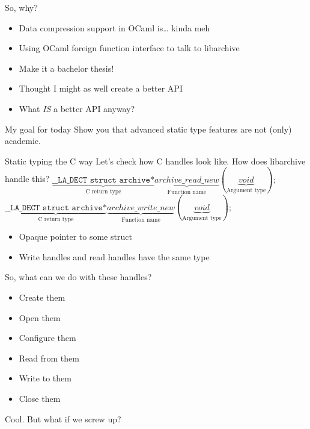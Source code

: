 \documentclass{beamer}
\begin{document}
\begin{frame}{So, why?}
  \begin{itemize}
    \item Data compression support in OCaml is… kinda meh
    \item Using OCaml foreign function interface to talk to libarchive
    \item Make it a bachelor thesis!
    \item Thought I might as well create a better API
    \item What \emph{IS} a better API anyway?
  \end{itemize}
  \pause
  \begin{exampleblock}{My goal for today}
    Show you that advanced static type features are not (only) academic.
  \end{exampleblock}
\end{frame}

\begin{frame}[fragile]{Static typing the C way}
  Let's check how C handles look like. How does libarchive handle this?
  $\underbrace{\texttt{\_\_LA\_DECT struct archive*}}_{\text{C return type}} \underbrace{archive\_read\_new}_{\text{Function name}}(\underbrace{void}_{\text{Argument type}});$
  $\underbrace{\texttt{\_\_LA\_DECT struct archive*}}_{\text{C return type}} \underbrace{archive\_write\_new}_{\text{Function name}}(\underbrace{void}_{\text{Argument type}});$
  \begin{itemize}
    \item Opaque pointer to some struct
    \item Write handles and read handles have the same type
  \end{itemize}
\end{frame}

\begin{frame}
  So, what can we do with these handles?
  \pause
  \begin{itemize}
    \item Create them
    \item Open them
    \item Configure them
    \item Read from them
    \item Write to them
    \item Close them
  \end{itemize}
  \pause
  Cool.
  \pause
  \alert{But what if we screw up?}
\end{frame}
\end{document}
